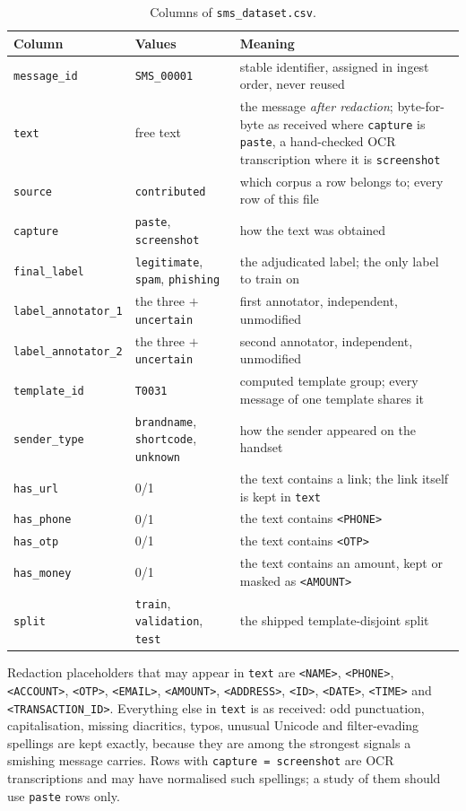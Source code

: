 \begin{table}[h]
\centering\footnotesize
\setlength{\tabcolsep}{4pt}
\caption{Columns of \texttt{sms\_dataset.csv}.}
\label{tab:schema}
\begin{tabular}{@{}l l p{8.2cm}@{}}
\toprule
Column & Values & Meaning \\
\midrule
\texttt{message\_id} & \texttt{SMS\_00001} & stable identifier, assigned in ingest order, never reused \\
\texttt{text} & free text & the message \emph{after redaction}; byte-for-byte as received where \texttt{capture} is \texttt{paste}, a hand-checked OCR transcription where it is \texttt{screenshot} \\
\texttt{source} & \texttt{contributed} & which corpus a row belongs to; every row of this file \\
\texttt{capture} & \texttt{paste}, \texttt{screenshot} & how the text was obtained \\
\texttt{final\_label} & \texttt{legitimate}, \texttt{spam}, \texttt{phishing} & the adjudicated label; the only label to train on \\
\texttt{label\_annotator\_1} & the three $+$ \texttt{uncertain} & first annotator, independent, unmodified \\
\texttt{label\_annotator\_2} & the three $+$ \texttt{uncertain} & second annotator, independent, unmodified \\
\texttt{template\_id} & \texttt{T0031} & computed template group; every message of one template shares it \\
\texttt{sender\_type} & \texttt{brandname}, \texttt{shortcode}, \texttt{unknown} & how the sender appeared on the handset \\
\texttt{has\_url} & 0/1 & the text contains a link; the link itself is kept in \texttt{text} \\
\texttt{has\_phone} & 0/1 & the text contains \texttt{<PHONE>} \\
\texttt{has\_otp} & 0/1 & the text contains \texttt{<OTP>} \\
\texttt{has\_money} & 0/1 & the text contains an amount, kept or masked as \texttt{<AMOUNT>} \\
\texttt{split} & \texttt{train}, \texttt{validation}, \texttt{test} & the shipped template-disjoint split \\
\bottomrule
\end{tabular}
\end{table}

Redaction placeholders that may appear in \texttt{text} are
\texttt{<NAME>}, \texttt{<PHONE>}, \texttt{<ACCOUNT>}, \texttt{<OTP>}, \texttt{<EMAIL>},
\texttt{<AMOUNT>}, \texttt{<ADDRESS>}, \texttt{<ID>}, \texttt{<DATE>}, \texttt{<TIME>} and
\texttt{<TRANSACTION\_ID>}. Everything else in \texttt{text} is as received: odd punctuation,
capitalisation, missing diacritics, typos, unusual Unicode and filter-evading spellings are kept
exactly, because they are among the strongest signals a smishing message carries. Rows with
\texttt{capture = screenshot} are OCR transcriptions and may have normalised such spellings; a
study of them should use \texttt{paste} rows only.

